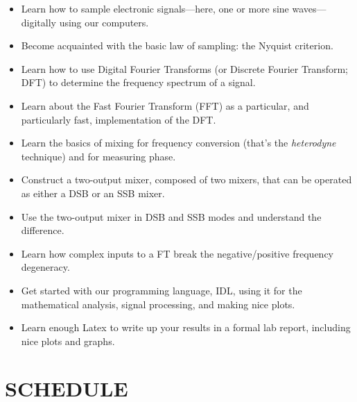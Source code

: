 \documentclass[11pt,preprint]{aastex}
\begin{document}
\begin{itemize}

\item Learn how to sample electronic signals---here, one or more sine
  waves---digitally using our computers.

\item Become acquainted with the basic law of sampling: the Nyquist
  criterion.

\item Learn how to use Digital Fourier Transforms (or Discrete Fourier
  Transform; DFT) to determine the
  frequency spectrum of a signal.

\item Learn about the Fast Fourier Transform (FFT) as a particular, and
  particularly fast, implementation of the DFT.

\item Learn the basics of mixing for frequency conversion (that's
  the {\it heterodyne} technique) and for measuring phase.

\item Construct a two-output mixer, composed of two mixers, that can be
  operated as either a DSB or an SSB mixer.

\item Use the two-output mixer in DSB and SSB modes and understand the
  difference.

\item Learn how complex inputs to a FT break the negative/positive
  frequency degeneracy.

\item Get started with our programming language, IDL, using it for the
  mathematical analysis, signal processing, and making nice plots.

\item Learn enough Latex to write up your results in a formal lab report,
  including nice plots and graphs.

\end{itemize}

\section{SCHEDULE}
\end{document}
